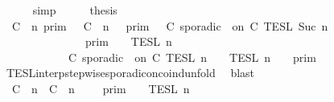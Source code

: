 \begin{isabellebody}
\ \ \ \ \isamarkupfalse%
\ simp\isanewline
\ \ \isamarkupfalse%
\ \isamarkupfalse%
\ {\isacharquery}thesis\isanewline
\ \ \isamarkupfalse%
\ {\isacharminus}\isanewline
\ \ \ \ \isamarkupfalse%
\ {\isacartoucheopen}{\isacharparenleft}{\isasymlbrakk}\ C\ {\isasymUp}\ n\ {\isasymrbrakk}\isactrlsub p\isactrlsub r\isactrlsub i\isactrlsub m\ {\isasyminter}\ {\isasymlbrakk}\ C\ {\isasymDown}\ n\ {\isacharat}\ {\isasymtau}\ {\isasymrbrakk}\isactrlsub p\isactrlsub r\isactrlsub i\isactrlsub m\ {\isasymunion}\ {\isasymlbrakk}\ C\ sporadic\ {\isasymtau}\ on\ C\ {\isasymrbrakk}\isactrlsub T\isactrlsub E\isactrlsub S\isactrlsub L\isactrlbsup {\isasymge}\ Suc\ n\isactrlesup {\isacharparenright}\isanewline
\ \ \ \ \ \ \ \ \ \ \ \ {\isasyminter}\ {\isacharparenleft}{\isasymlbrakk}{\isasymlbrakk}\ {\isasymGamma}\ {\isasymrbrakk}{\isasymrbrakk}\isactrlsub p\isactrlsub r\isactrlsub i\isactrlsub m\ {\isasyminter}\ {\isasymlbrakk}{\isasymlbrakk}\ {\isasymPsi}\ {\isasymrbrakk}{\isasymrbrakk}\isactrlsub T\isactrlsub E\isactrlsub S\isactrlsub L\isactrlbsup {\isasymge}\ n\isactrlesup {\isacharparenright}\isanewline
\ \ \ \ \ \ \ \ \ \ {\isacharequal}\ {\isasymlbrakk}\ C\ sporadic\ {\isasymtau}\ on\ C\ {\isasymrbrakk}\isactrlsub T\isactrlsub E\isactrlsub S\isactrlsub L\isactrlbsup {\isasymge}\ n\isactrlesup \ {\isasyminter}\ {\isacharparenleft}{\isasymlbrakk}{\isasymlbrakk}\ {\isasymPsi}\ {\isasymrbrakk}{\isasymrbrakk}\isactrlsub T\isactrlsub E\isactrlsub S\isactrlsub L\isactrlbsup {\isasymge}\ n\isactrlesup \ {\isasyminter}\ {\isasymlbrakk}{\isasymlbrakk}\ {\isasymGamma}\ {\isasymrbrakk}{\isasymrbrakk}\isactrlsub p\isactrlsub r\isactrlsub i\isactrlsub m{\isacharparenright}{\isacartoucheclose}\isanewline
\ \ \ \ \ \ \isamarkupfalse%
\ TESL{\isacharunderscore}interp{\isacharunderscore}stepwise{\isacharunderscore}sporadicon{\isacharunderscore}coind{\isacharunderscore}unfold\ \isamarkupfalse%
\ blast\isanewline
\ \ \ \ \isamarkupfalse%
\ {\isacartoucheopen}{\isasymlbrakk}{\isasymlbrakk}\ {\isacharparenleft}{\isacharparenleft}C\ {\isasymUp}\ n{\isacharparenright}\ {\isacharhash}\ {\isacharparenleft}C\ {\isasymDown}\ n\ {\isacharat}\ {\isasymtau}{\isacharparenright}\ {\isacharhash}\ {\isasymGamma}{\isacharparenright}\ {\isasymrbrakk}{\isasymrbrakk}\isactrlsub p\isactrlsub r\isactrlsub i\isactrlsub m\ {\isasyminter}\ {\isasymlbrakk}{\isasymlbrakk}\ {\isasymPsi}\ {\isasymrbrakk}{\isasymrbrakk}\isactrlsub T\isactrlsub E\isactrlsub S\isactrlsub L\isactrlbsup {\isasymge}\ n\isactrlesup \isanewline

\end{isabellebody}
